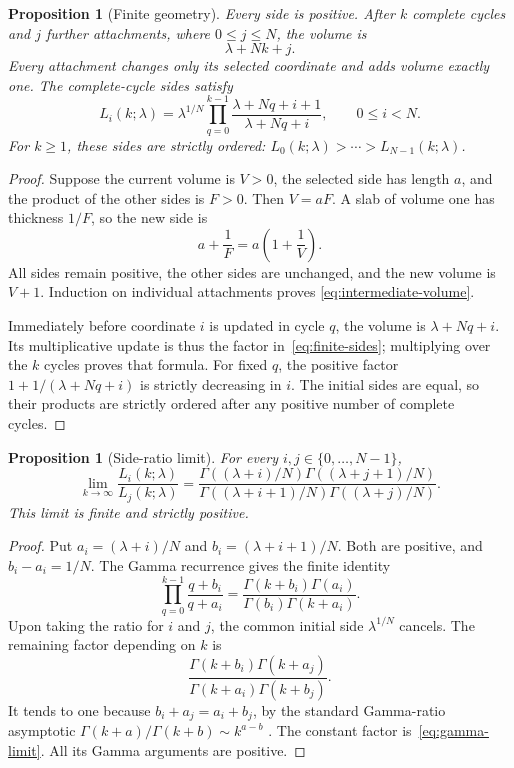 \documentclass[11pt]{article}
\numberwithin{equation}{section}
\newtheorem{proposition}[theorem]{Proposition}
\theoremstyle{remark}
\begin{document}
\begin{proposition}[Finite geometry]
\label{prop:geometry}
Every side is positive. After $k$ complete cycles and $j$ further
attachments, where $0\leq j\leq N$, the volume is
\begin{equation}
  \lambda+Nk+j.
  \label{eq:intermediate-volume}
\end{equation}
Every attachment changes only its selected coordinate and adds
volume exactly one. The complete-cycle sides satisfy
\begin{equation}
  L_i(k;\lambda)=\lambda^{1/N}
       \prod_{q=0}^{k-1}
          \frac{\lambda+Nq+i+1}{\lambda+Nq+i},
  \qquad 0\leq i<N.
  \label{eq:finite-sides}
\end{equation}
For $k\geq1$, these sides are strictly ordered:
$L_0(k;\lambda)>\cdots>L_{N-1}(k;\lambda)$.
\end{proposition}

\begin{proof}
Suppose the current volume is $V>0$, the selected side has length $a$,
and the product of the other sides is $F>0$. Then $V=aF$.
A slab of volume one has thickness $1/F$, so the new side is
\[
  a+\frac1F=a\left(1+\frac1V\right).
\]
All sides remain positive, the other sides are unchanged, and the
new volume is $V+1$. Induction on individual attachments proves
\eqref{eq:intermediate-volume}.

Immediately before coordinate $i$ is updated in cycle $q$, the
volume is $\lambda+Nq+i$. Its multiplicative update is thus the
factor in~\eqref{eq:finite-sides}; multiplying over the $k$ cycles
proves that formula. For fixed $q$, the positive factor
$1+1/(\lambda+Nq+i)$ is strictly decreasing in $i$.
The initial sides are equal, so their products are strictly ordered
after any positive number of complete cycles.
\end{proof}

\begin{proposition}[Side-ratio limit]
\label{prop:gamma-limit}
For every $i,j\in\{0,\ldots,N-1\}$,
\begin{equation}
  \lim_{k\to\infty}\frac{L_i(k;\lambda)}{L_j(k;\lambda)}
  =
  \frac{\Gamma((\lambda+i)/N)\Gamma((\lambda+j+1)/N)}
       {\Gamma((\lambda+i+1)/N)\Gamma((\lambda+j)/N)}.
  \label{eq:gamma-limit}
\end{equation}
This limit is finite and strictly positive.
\end{proposition}

\begin{proof}
Put $a_i=(\lambda+i)/N$ and $b_i=(\lambda+i+1)/N$.
Both are positive, and $b_i-a_i=1/N$.
The Gamma recurrence gives the finite identity
\[
  \prod_{q=0}^{k-1}\frac{q+b_i}{q+a_i}
  =\frac{\Gamma(k+b_i)\Gamma(a_i)}
         {\Gamma(b_i)\Gamma(k+a_i)}.
\]
Upon taking the ratio for $i$ and $j$, the common initial side
$\lambda^{1/N}$ cancels. The remaining factor depending on $k$ is
\[
  \frac{\Gamma(k+b_i)\Gamma(k+a_j)}
       {\Gamma(k+a_i)\Gamma(k+b_j)}.
\]
It tends to one because $b_i+a_j=a_i+b_j$, by the standard
Gamma-ratio asymptotic
$\Gamma(k+a)/\Gamma(k+b)\sim k^{a-b}$
\cite[Eq.~5.11.12]{DLMF}.
The constant factor is~\eqref{eq:gamma-limit}.
All its Gamma arguments are positive.
\end{proof}
\end{document}

